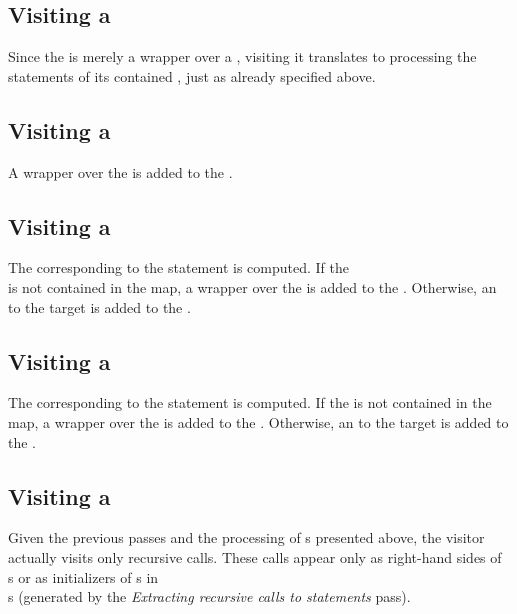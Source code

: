 \subsection{Visiting a }
Since the  is merely a wrapper over a , visiting it translates to processing
the statements of its contained , just as already specified above.

\subsection{Visiting a }

A  wrapper over the  is added to the .

\subsection{Visiting a }

The  corresponding to the  statement is computed. If the\\
 is not contained in the  map, a  wrapper over
the  is added to the . Otherwise, an  to
the target  is added to the .

\subsection{Visiting a }

The  corresponding to the  statement is computed. If the 
is not contained in the  map, a  wrapper over the 
is added to the . Otherwise, an  to the target  is added
to the .

\subsection{Visiting a }

Given the previous passes and the processing of s presented above, the visitor actually visits only
recursive calls. These calls appear only as right-hand sides of\\
s or as initializers of s in\\
s (generated by the \textit{Extracting recursive calls to statements} pass).


